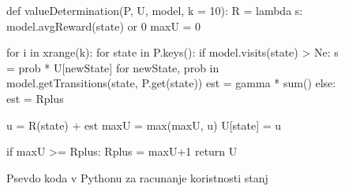 \documentclass[a4paper]{article}
\begin{document}
\begin{figure}[H]
\begin{python}
def valueDetermination(P, U, model, k = 10):
    R = lambda s: model.avgReward(state) or 0
    maxU = 0

    for i in xrange(k):
        for state in P.keys():
            if model.visits(state) > Ne:
                s = prob * U[newState] for newState, prob in 
                    model.getTransitions(state, P.get(state))
                est = gamma * sum()
            else:
                est = Rplus

            u = R(state) + est
            maxU = max(maxU, u)
            U[state] = u
        
            if maxU >= Rplus:
                Rplus = maxU+1
        return U
\end{python}
\caption{Psevdo koda v Pythonu za racunanje koristnosti stanj}
\end{figure}
\end{document}

